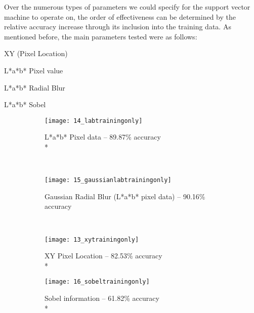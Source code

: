 Over the numerous types of parameters we could specify for the support vector machine to operate on, the order of effectiveness can be determined by the relative accuracy increase through its inclusion into the training data.
As mentioned before, the main parameters tested were as follows:
\begin{description}


  \item XY (Pixel Location)
  \item L*a*b* Pixel value
  \item L*a*b* Radial Blur
  \item L*a*b* Sobel
\end{description}
\begin{figure}
        \centering
        \begin{subfigure}[b]{0.3\textwidth}
                \centering
                \texttt{[image: 14\_labtrainingonly]}
                \caption{L*a*b* Pixel data -- 89.87\% accuracy \\*}
                \label{fig:14_labtrainingonly}
        \end{subfigure}%
        ~ %
        \begin{subfigure}[b]{0.3\textwidth}
                \centering

                \texttt{[image: 15\_gaussianlabtrainingonly]}
                \caption{Gaussian Radial Blur (L*a*b* pixel data) -- 90.16\% accuracy}
                \label{fig:15_gaussianlabtrainingonly}     
        \end{subfigure}
        ~ %
        \begin{subfigure}[b]{0.3\textwidth}
                \centering

                \texttt{[image: 13\_xytrainingonly]}
                \caption{XY Pixel Location -- 82.53\% accuracy \\*}
                \label{fig:13_xytrainingonly}
        \end{subfigure}
         \begin{subfigure}[b]{0.3\textwidth}
                \centering

                \texttt{[image: 16\_sobeltrainingonly]}
                \caption{Sobel information -- 61.82\% accuracy \\*}
                \label{fig:16_sobeltrainingonly}
        \end{subfigure}
        \begin{subfigure}[b]{0.3\textwidth}
                \centering


\end{subfigure}
\end{figure}
